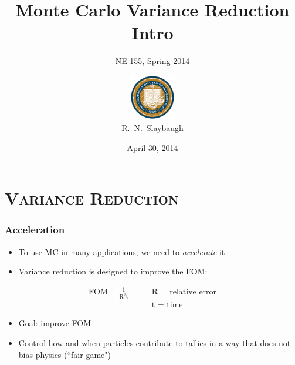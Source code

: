 \documentclass[xcolor=x11names,compress]{beamer}
\renewcommand{\(}{\begin{columns}}
\renewcommand{\)}{\end{columns}}
\newcommand{\<}[1]{\begin{column}{#1}}
\renewcommand{\>}{\end{column}}
\begin{document}
\begin{frame}
\title{Monte Carlo Variance Reduction Intro}
\subtitle{NE 155, Spring 2014}
\author{
        \includegraphics[height=2cm]{bk}\\R.\ N.\ Slaybaugh}

\date{April 30, 2014}
\titlepage
\end{frame}


\section{\scshape Variance Reduction}
\begin{frame}[fragile]
  \frametitle{Acceleration}
  \begin{itemize}
  	\item To use MC in many applications, we need to \textit{accelerate} it
	\item Variance reduction is designed to improve the FOM:
  \end{itemize}
  \begin{align}
  \text{FOM} = \frac{1}{\text{R}^2\text{t}} \qquad & \text{R = relative error} \nonumber \\ 
  & \text{t = time} \nonumber 
  \end{align}
  \begin{itemize}
  	\item \underline{Goal:} improve FOM
  	\item Control how and when particles contribute to tallies in a way that does not bias physics (``fair game") 
  \end{itemize}

\end{frame}
\end{document}
